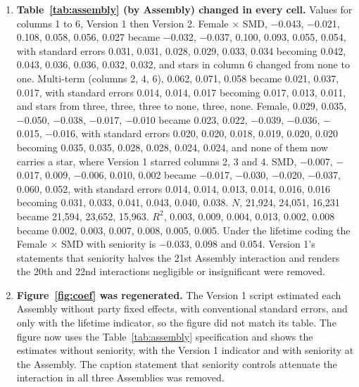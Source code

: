 \documentclass[11pt]{article}
\begin{document}
{\begin{enumerate}
\item \textbf{Table~\ref{tab:assembly} (by Assembly) changed in every cell.} Values for columns 1 to 6, Version 1 then Version 2. Female $\times$ SMD, $-$0.043, $-$0.021, 0.108, 0.058, 0.056, 0.027 became $-$0.032, $-$0.037, 0.100, 0.093, 0.055, 0.054, with standard errors 0.031, 0.031, 0.028, 0.029, 0.033, 0.034 becoming 0.042, 0.043, 0.036, 0.036, 0.032, 0.032, and stars in column 6 changed from none to one. Multi-term (columns 2, 4, 6), 0.062, 0.071, 0.058 became 0.021, 0.037, 0.017, with standard errors 0.014, 0.014, 0.017 becoming 0.017, 0.013, 0.011, and stars from three, three, three to none, three, none. Female, 0.029, 0.035, $-$0.050, $-$0.038, $-$0.017, $-$0.010 became 0.023, 0.022, $-$0.039, $-$0.036, $-$0.015, $-$0.016, with standard errors 0.020, 0.020, 0.018, 0.019, 0.020, 0.020 becoming 0.035, 0.035, 0.028, 0.028, 0.024, 0.024, and none of them now carries a star, where Version 1 starred columns 2, 3 and 4. SMD, $-$0.007, $-$0.017, 0.009, $-$0.006, 0.010, 0.002 became $-$0.017, $-$0.030, $-$0.020, $-$0.037, 0.060, 0.052, with standard errors 0.014, 0.014, 0.013, 0.014, 0.016, 0.016 becoming 0.031, 0.033, 0.041, 0.043, 0.040, 0.038. $N$, 21,924, 24,051, 16,231 became 21,594, 23,652, 15,963. $R^2$, 0.003, 0.009, 0.004, 0.013, 0.002, 0.008 became 0.002, 0.003, 0.007, 0.008, 0.005, 0.005. Under the lifetime coding the Female $\times$ SMD with seniority is $-$0.033, 0.098 and 0.054. Version 1's statements that seniority halves the 21st Assembly interaction and renders the 20th and 22nd interactions negligible or insignificant were removed.
\item \textbf{Figure~\ref{fig:coef} was regenerated.} The Version 1 script estimated each Assembly without party fixed effects, with conventional standard errors, and only with the lifetime indicator, so the figure did not match its table. The figure now uses the Table~\ref{tab:assembly} specification and shows the estimates without seniority, with the Version 1 indicator and with seniority at the Assembly. The caption statement that seniority controls attenuate the interaction in all three Assemblies was removed.

\end{enumerate}}
\end{document}
